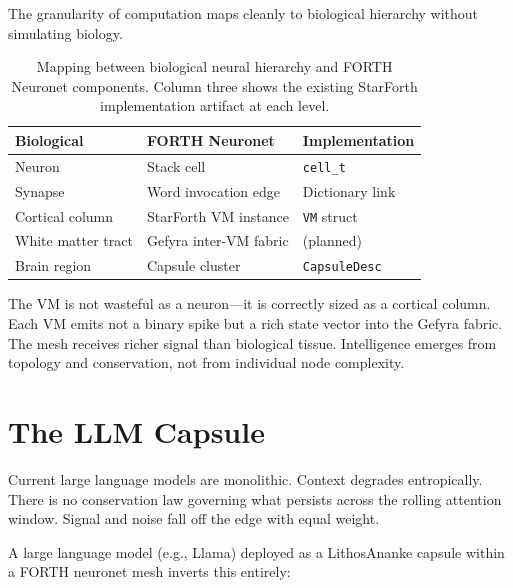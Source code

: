 \documentclass[11pt]{article}
\begin{document}
The granularity of computation maps cleanly to biological hierarchy without
simulating biology.

\begin{table}[h]
\centering
\begin{tabular}{@{}lll@{}}
\toprule
\textbf{Biological} & \textbf{FORTH Neuronet} & \textbf{Implementation} \\
\midrule
Neuron              & Stack cell              & \texttt{cell\_t} \\
Synapse             & Word invocation edge    & Dictionary link \\
Cortical column     & StarForth VM instance   & \texttt{VM} struct \\
White matter tract  & Gefyra inter-VM fabric  & (planned) \\
Brain region        & Capsule cluster         & \texttt{CapsuleDesc} \\
\bottomrule
\end{tabular}
\caption{Mapping between biological neural hierarchy and FORTH Neuronet
         components. Column three shows the existing StarForth implementation
         artifact at each level.}
\end{table}

The VM is not wasteful as a neuron---it is correctly sized as a cortical
column. Each VM emits not a binary spike but a rich state vector into the
Gefyra fabric. The mesh receives richer signal than biological tissue.
Intelligence emerges from topology and conservation, not from individual
node complexity.

\section{The LLM Capsule}

Current large language models are monolithic. Context degrades entropically.
There is no conservation law governing what persists across the rolling
attention window. Signal and noise fall off the edge with equal weight.

A large language model (e.g., Llama) deployed as a LithosAnanke capsule
within a FORTH neuronet mesh inverts this entirely:
\end{document}
